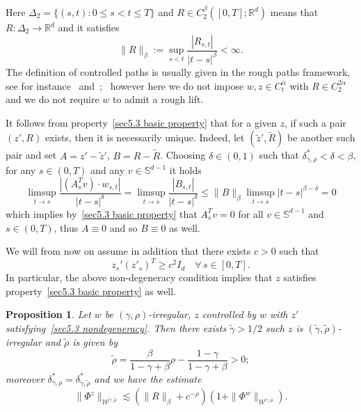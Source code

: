\documentclass[10pt]{article}
\newcommand{\assign}{:=}
\newtheorem{proposition}[theorem]{Proposition}
{\theorembodyfont{\rmfamily}\newtheorem{remark}[theorem]{Remark}}
\begin{document}
Here $\Delta_2 = \{ (s, t) : 0 \leqslant s < t \leqslant T \}$ and $R \in
C^{\beta}_2 ([0, T] ; \mathbb{R}^d)$ means that $R : \Delta_2 \rightarrow
\mathbb{R}^d$ and it satisfies
\[ \| R \|_{\beta} \assign \sup_{s < t} \frac{| R_{s, t} |}{| t - s |^{\beta}}
   < \infty . \]
The definition of controlled paths is usually given in the rough paths
framework, see for instance~{\cite{gubinelli}} and~{\cite{frizhairer}}; \
however here we do not impose $w, z \in C^{\alpha}_t$ with $R \in C_2^{2
\alpha}$ and we do not require $w$ to admit a rough lift.

It follows from property~{\eqref{sec5.3 basic property}} that for a given $z$,
if such a pair $(z', R)$ exists, then it is necessarily unique. Indeed, let
$(\tilde{z}', \tilde{R})$ be another such pair and set $A = z' - \tilde{z}'$,
$B = R - \tilde{R}$. Choosing $\delta \in (0, 1)$ such that
$\delta^{\ast}_{\gamma, \rho} < \delta < \beta$, for any $s \in (0, T)$ and
any $v \in \mathbb{S}^{d - 1}$ it holds
\[ \limsup_{t \rightarrow s} \frac{| (A_s^T v) \cdot w_{s, t} |}{| t - s
   |^{\delta}} = \limsup_{t \rightarrow s} \frac{| B_{s, t} |}{| t - s
   |^{\delta}} \leqslant \| B \|_{\beta} \limsup_{t \rightarrow s} | t - s
   |^{\beta - \delta} = 0 \]
which implies by~{\eqref{sec5.3 basic property}} that $A^T_s v = 0$ for all $v
\in \mathbb{S}^{d - 1}$ and $s \in (0, T)$, thus $A \equiv 0$ and so $B \equiv
0$ as well.

We will from now on assume in addition that there exists $c > 0$ such that
\begin{equation}
  z_s'  (z'_s)^T \geqslant c^2 I_d \quad \forall \, s \in [0, T] .
  \label{sec5.3 nondegeneracy}
\end{equation}
In particular, the above non-degeneracy condition implies that $z$ satisfies
property~{\eqref{sec5.3 basic property}} as well.

\begin{proposition}
  \label{sec5.3 prop perturbations}Let $w$ be $(\gamma,
  \rho)$\mbox{-}irregular, $z$ controlled by $w$ with $z'$
  satisfying~{\eqref{sec5.3 nondegeneracy}}. Then there exists $\tilde{\gamma}
  > 1 / 2$ such $z$ is $(\tilde{\gamma}, \tilde{\rho})$\mbox{-}irregular and
  $\tilde{\rho}$ is given by
  \[ \tilde{\rho} = \frac{\beta}{1 - \gamma + \beta} \rho - \frac{1 -
     \gamma}{1 - \gamma + \beta} > 0 ; \]
  moreover $\delta^{\ast}_{\gamma, \rho} = \delta^{\ast}_{\tilde{\gamma},
  \tilde{\rho}}$ and we have the estimate
  \[ \| \Phi^z \|_{\mathcal{W}^{\tilde{\gamma}, \tilde{\rho}}} \lesssim (\| R
     \|_{\beta} + c^{- \rho}) (1 + \| \Phi^w \|_{\mathcal{W}^{\gamma, \rho}})
     . \]
\end{proposition}
\end{document}
